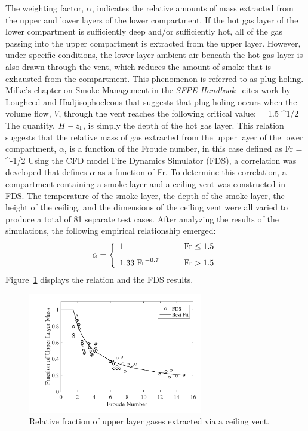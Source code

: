 \documentclass[12pt]{book}
\begin{document}
The weighting factor, $\alpha$, indicates the relative amounts of mass extracted from the upper and lower layers of the lower compartment. If the hot gas layer of the lower compartment is sufficiently deep and/or sufficiently hot, all of the gas passing into the upper compartment is extracted from the upper layer. However, under specific conditions, the lower layer ambient air beneath the hot gas layer is also drawn through the vent, which reduces the amount of smoke that is exhausted from the compartment. This phenomenon is referred to as plug-holing. Milke's chapter on Smoke Management in the {\em SFPE Handbook}~\cite{Milke:SFPE} cites work by Lougheed and Hadjisophocleous that suggests that plug-holing occurs when the volume flow, $\dot{V}$, through the vent reaches the following critical value:
\be
    = 1.5 \; ^{1/2}
\ee
The quantity, $H-z_{\rm I}$, is simply the depth of the hot gas layer. This relation suggests that the relative mass of gas extracted from the upper layer of the lower compartment, $\alpha$, is a function of the Froude number, in this case defined as
\be
   {\rm Fr} =  \; ^{-1/2}
\ee
Using the CFD model Fire Dynamics Simulator (FDS), a correlation was developed that defines $\alpha$ as a function of Fr. To determine this correlation, a compartment containing a smoke layer and a ceiling vent was constructed in FDS. The temperature of the smoke layer, the depth of the smoke layer, the height of the ceiling, and the dimensions of the ceiling vent were all varied to produce a total of 81 separate test cases. After analyzing the results of the simulations, the following empirical relationship emerged:
 \begin{equation}
 \label{equation1}
  \alpha = \left\{ \begin{array}{ll} 1 & \quad \quad {\rm Fr}\le 1.5 \\[.1in] 1.33 \; {\rm Fr}^{-0.7} & \quad \quad {\rm Fr}> 1.5 \end{array}  \right.
\end{equation}
Figure~\ref{correlation} displays the relation and the FDS results.
\begin{figure}[!ht]
\label{correlation}
\centering
\includegraphics[width=3.0in]{FIGURES/Theory/Vent_Mass_Fraction}
\caption[Relative fraction of upper layer gases extracted via a ceiling vent]{Relative fraction of upper layer gases extracted via a ceiling vent.}
\end{figure}
\end{document}
